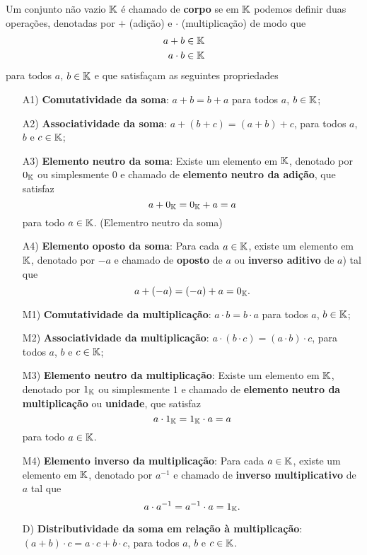 \begin{definicao}
	Um conjunto n\~ao vazio $\mathbb{K}$ \'e chamado de \textbf{corpo} se em $\mathbb{K}$ podemos definir duas opera\c{c}\~oes, denotadas por
	$+$ (adi\c{c}\~ao) e $\cdot$ (multiplica\c{c}\~ao) de modo que
	\begin{align*}
		a + b \in \mathbb{K}\\
		a \cdot b \in \mathbb{K}
	\end{align*}
	para todos $a$, $b \in \mathbb{K}$ e que satisfa\c{c}am as seguintes propriedades
	\begin{itemize}

		\item[A1)] \textbf{Comutatividade da soma}: $a + b = b + a$ para todos $a$, $b \in \mathbb{K}$;
		\item[A2)] \textbf{Associatividade da soma}: $a + (b + c) = (a + b) + c$, para todos $a$, $b$ e $c \in \mathbb{K}$;
		\item[A3)] \textbf{Elemento neutro da soma}: Existe um elemento em $\mathbb{K}$, denotado por $0_{\mathbb{K}}$ ou simplesmente $0$ e chamado de \textbf{elemento neutro da adi\c{c}\~ao}, que satisfaz
		\[
		  a + 0_{\mathbb{K}} = 0_{\mathbb{K}} + a = a
		\]
		para todo $a \in \mathbb{K}$. (Elementro neutro da soma)
		\item[A4)] \textbf{Elemento oposto da soma}: Para cada $a \in \mathbb{K}$, existe um elemento em $\mathbb{K}$, denotado por $-a$ e chamado de \textbf{oposto} de $a$ ou \textbf{inverso aditivo} de $a$) tal que
		\[
		  a + (-a) = (-a) + a = 0_{\mathbb{K}}.
		\]
		\item[M1)] \textbf{Comutatividade da multiplica\c{c}\~ao}: $a \cdot b = b \cdot a$ para todos $a$, $b \in \mathbb{K}$;
		\item[M2)] \textbf{Associatividade da multiplica\c{c}\~ao}: $a \cdot (b \cdot c) = (a \cdot b) \cdot c$, para todos $a$, $b$ e $c \in \mathbb{K}$;
		\item[M3)] \textbf{Elemento neutro da multiplica\c{c}\~ao}: Existe um elemento em $\mathbb{K}$, denotado por $1_{\mathbb{K}}$ ou simplesmente $1$ e chamado de \textbf{elemento neutro da multiplica\c{c}\~ao} ou \textbf{unidade}, que satisfaz
		\[
		  a \cdot 1_{\mathbb{K}} = 1_{\mathbb{K}} \cdot a = a
		\]
		para todo $a \in \mathbb{K}$.
		\item[M4)] \textbf{Elemento inverso da multiplica\c{c}\~ao}: Para cada $a \in \mathbb{K}$, existe um elemento em $\mathbb{K}$, denotado por $a^{-1}$ e chamado de \textbf{inverso multiplicativo} de $a$ 
		tal que
		\[
		  a \cdot a^{-1} = a^{-1} \cdot a = 1_{\mathbb{K}}.
		\]
		\item[D)] \textbf{Distributividade da soma em rela\c{c}\~ao \`a multiplica\c{c}\~ao}: $(a + b)\cdot c = a\cdot c + b\cdot c$, para todos $a$, $b$ e $c \in \mathbb{K}$.
	\end{itemize}
\end{definicao}

